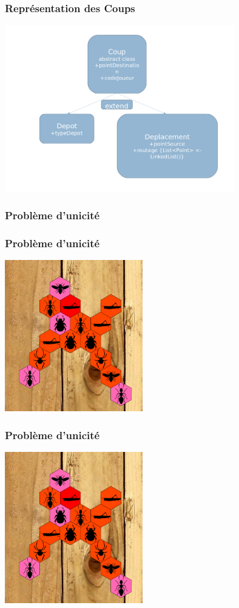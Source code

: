 \documentclass{beamer}
\begin{document}
    \begin{frame}
        \frametitle{Repr\'esentation des Coups}
        \includegraphics[width=10cm]{./coupRepres.png}
    \end{frame}
    \begin{frame}
        \frametitle{Probl\`eme d'unicit\'e}
    \end{frame}
    \begin{frame}
        \frametitle{Probl\`eme d'unicit\'e}
        \begin{center}
        \includegraphics[width=6cm]{./graphe.png}
        \end{center}
    \end{frame}
    \begin{frame}
        \frametitle{Probl\`eme d'unicit\'e}
        \begin{center}
        \includegraphics[width=6cm]{./graphe.png}
        \end{center}
    \end{frame}
\end{document}
